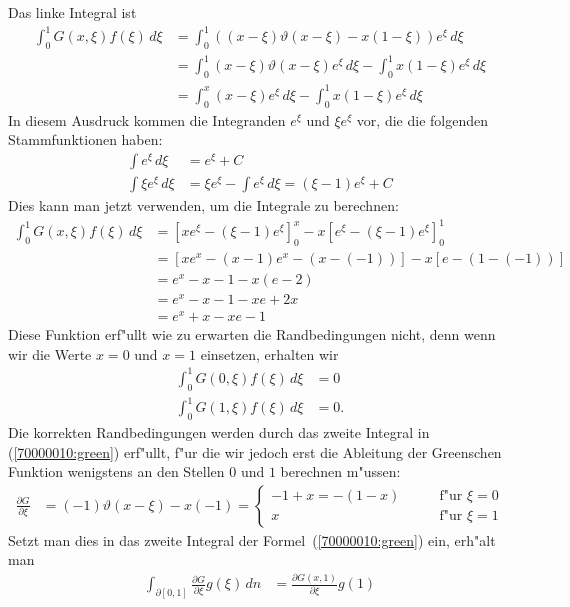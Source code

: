 \begin{loesung}
Das linke Integral ist
\begin{align*}
\int_0^1 G(x,\xi) f(\xi)\,d\xi
&=
\int_0^1 ( (x-\xi)\vartheta(x-\xi) -x(1-\xi)) e^{\xi} \,d\xi
\\
&=
\int_0^1 (x-\xi)\vartheta(x-\xi) e^{\xi} \,d\xi
-
\int_0^1 x(1-\xi) e^{\xi} \,d\xi
\\
&=
\int_0^x (x-\xi) e^{\xi} \,d\xi
-
\int_0^1 x(1-\xi) e^{\xi} \,d\xi
\end{align*}
In diesem Ausdruck kommen die Integranden $e^\xi$ und $\xi e^\xi$ vor,
die die folgenden Stammfunktionen haben:
\begin{align*}
\int e^\xi\,d\xi&=e^\xi + C\\
\int \xi e^\xi\,d\xi&=\xi e^\xi - \int e^\xi\,d\xi = (\xi - 1)e^\xi + C
\end{align*}
Dies kann man jetzt verwenden, um die Integrale zu berechnen:
\begin{align*}
\int_0^1 G(x,\xi) f(\xi)\,d\xi
&=
\left[
xe^\xi -(\xi - 1)e^\xi
\right]_0^x
-
x\left[
e^\xi-(\xi - 1)e^\xi
\right]_0^1
\\
&=
\left[
xe^x-(x-1)e^x
-
(x-(-1))
\right]
-
x
\left[
e - (1-(-1))
\right]
\\
&=
e^x-x-1
-
x(e-2)
\\
&=
e^x-x-1
-xe+2x
\\
&=
e^x+x-xe-1
\end{align*}
Diese Funktion erf"ullt wie zu erwarten die Randbedingungen nicht, denn
wenn wir die Werte $x=0$ und $x=1$ einsetzen, erhalten wir
\begin{align*}
\int_0^1 G(0,\xi) f(\xi)\,d\xi
&=0
\\
\int_0^1 G(1,\xi) f(\xi)\,d\xi
&=0.
\end{align*}
Die korrekten Randbedingungen werden durch das zweite Integral in
(\ref{70000010:green}) erf"ullt, f"ur die wir jedoch erst die
Ableitung der Greenschen Funktion wenigstens an den Stellen $0$ und $1$
berechnen m"ussen:
\begin{align*}
\frac{\partial G}{\partial\xi}
&=(-1)\vartheta(x-\xi) - x(-1)
=\begin{cases}
-1+x=-(1-x)
\qquad&\text{f"ur $\xi=0$}
\\
x
\qquad&\text{f"ur $\xi=1$}
\end{cases}
\end{align*}
Setzt man dies in das zweite Integral der Formel~(\ref{70000010:green}) ein,
erh"alt man
\begin{align*}
\int_{\partial[0,1]}\frac{\partial G}{\partial \xi} g(\xi)\,dn
&=
\frac{\partial G(x,1)}{\partial\xi} g(1)

\end{align*}
\end{loesung}
